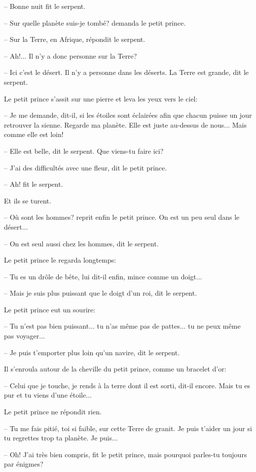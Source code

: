 \documentclass[a4paper]{report}
\begin{document}
-- Bonne nuit fit le serpent.

-- Sur quelle planète suis-je tombé? demanda le petit prince.

-- Sur la Terre, en Afrique, répondit le serpent.

-- Ah!... Il n'y a donc personne sur la Terre?

-- Ici c'est le désert. Il n'y a personne dans les déserts. La Terre est grande, dit le serpent.

Le petit prince s'assit sur une pierre et leva les yeux vers le ciel:

-- Je me demande, dit-il, si les étoiles sont éclairées afin que chacun puisse un jour retrouver la sienne. Regarde ma planète. Elle est juste au-dessus de nous... Mais comme elle est loin!

-- Elle est belle, dit le serpent. Que viens-tu faire ici?

-- J'ai des difficultés avec une fleur, dit le petit prince.

-- Ah! fit le serpent.

Et ils se turent.

-- Où sont les hommes? reprit enfin le petit prince. On est un peu seul dans le désert...

-- On est seul aussi chez les hommes, dit le serpent.

Le petit prince le regarda longtemps:


-- Tu es un drôle de bête, lui dit-il enfin, mince comme un doigt...

-- Mais je suis plus puissant que le doigt d'un roi, dit le serpent.

Le petit prince eut un sourire:

-- Tu n'est pas bien puissant... tu n'as même pas de pattes... tu ne peux même pas voyager...

-- Je puis t'emporter plus loin qu'un navire, dit le serpent.

Il s'enroula autour de la cheville du petit prince, comme un bracelet d'or:

-- Celui que je touche, je rends à la terre dont il est sorti, dit-il encore. Mais tu es pur et tu viens d'une étoile...

Le petit prince ne répondit rien.

-- Tu me fais pitié, toi si faible, sur cette Terre de granit. Je puis t'aider un jour si tu regrettes trop ta planète. Je puis...

-- Oh! J'ai très bien compris, fit le petit prince, mais pourquoi parles-tu toujours par énigmes?
\end{document}
